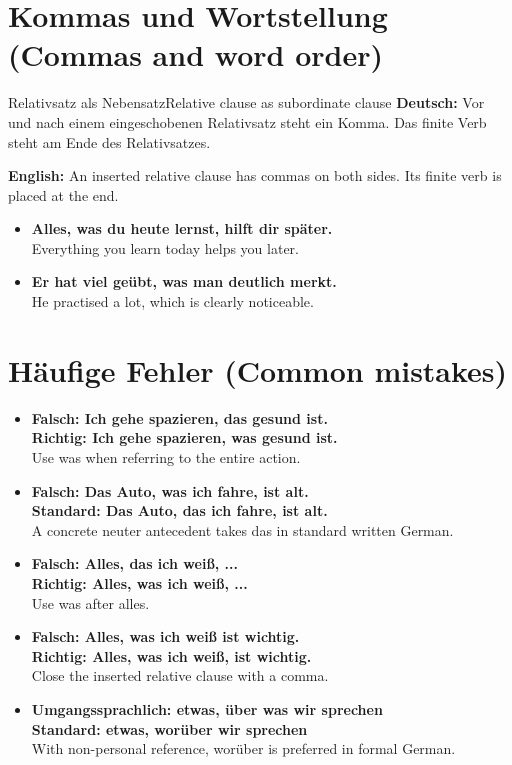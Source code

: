\documentclass[a4paper,11pt]{article}
\newcommand{\GermanText}[1]{\textbf{Deutsch: }#1\par}
\newcommand{\EnglishText}[1]{{\small\color{SoftGray}\textbf{English: }#1\par}}
\newcommand{\ExampleItem}[2]{\item \textbf{#1}\\{\small\color{SoftGray}#2}}
\begin{document}
   \section{Kommas und Wortstellung (Commas and word order)}
                                 \begin{grammarentry}{Relativsatz als Nebensatz}{Relative clause as subordinate clause}
                                    \GermanText{Vor und nach einem eingeschobenen Relativsatz steht ein Komma. Das finite Verb steht am Ende des Relativsatzes.}
                                    \EnglishText{An inserted relative clause has commas on both sides. Its finite verb is placed at the end.}
                                 \end{grammarentry}
                                 \begin{exbox}\begin{itemize}
                                    \ExampleItem{Alles, was du heute lernst, hilft dir später.}{Everything you learn today helps you later.}
                                    \ExampleItem{Er hat viel geübt, was man deutlich merkt.}{He practised a lot, which is clearly noticeable.}
                                    \end{itemize}\end{exbox}
   \section{Häufige Fehler (Common mistakes)}
                                    \begin{exbox}\begin{itemize}
                                       \ExampleItem{Falsch: Ich gehe spazieren, das gesund ist.\\Richtig: Ich gehe spazieren, was gesund ist.}{Use was when referring to the entire action.}
                                       \ExampleItem{Falsch: Das Auto, was ich fahre, ist alt.\\Standard: Das Auto, das ich fahre, ist alt.}{A concrete neuter antecedent takes das in standard written German.}
                                       \ExampleItem{Falsch: Alles, das ich weiß, ...\\Richtig: Alles, was ich weiß, ...}{Use was after alles.}
                                       \ExampleItem{Falsch: Alles, was ich weiß ist wichtig.\\Richtig: Alles, was ich weiß, ist wichtig.}{Close the inserted relative clause with a comma.}
                                       \ExampleItem{Umgangssprachlich: etwas, über was wir sprechen\\Standard: etwas, worüber wir sprechen}{With non-personal reference, worüber is preferred in formal German.}
                                       \end{itemize}\end{exbox}
\end{document}
